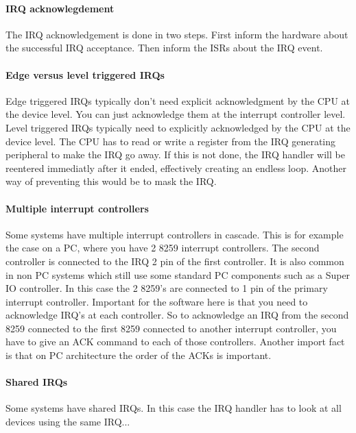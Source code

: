 \documentclass[9pt,a4paper]{extarticle}
\begin{document}
\paragraph{IRQ acknowlegdement}

The IRQ acknowledgement is done in two steps. First inform the
hardware about the successful IRQ acceptance. Then inform the ISRs
about the IRQ event.

\paragraph{Edge versus level triggered IRQs}

Edge triggered IRQs typically don't need explicit acknowledgment by
the CPU at the device level. You can just acknowledge them at the
interrupt controller level.  Level triggered IRQs typically need to
explicitly acknowledged by the CPU at the device level. The CPU has to
read or write a register from the IRQ generating peripheral to make
the IRQ go away. If this is not done, the IRQ handler will be
reentered immediatly after it ended, effectively creating an endless
loop. Another way of preventing this would be to mask the IRQ.

\paragraph{Multiple interrupt controllers}

Some systems have multiple interrupt controllers in cascade. This is
for example the case on a PC, where you have 2 8259 interrupt
controllers. The second controller is connected to the IRQ 2 pin of
the first controller. It is also common in non PC systems which still
use some standard PC components such as a Super IO controller. In this
case the 2 8259's are connected to 1 pin of the primary interrupt
controller. Important for the software here is that you need to
acknowledge IRQ's at each controller. So to acknowledge an IRQ from
the second 8259 connected to the first 8259 connected to another
interrupt controller, you have to give an ACK command to each of those
controllers.  Another import fact is that on PC architecture the order
of the ACKs is important.

\paragraph{Shared IRQs}

Some systems have shared IRQs. In this case the IRQ handler has to
look at all devices using the same IRQ...
\end{document}
